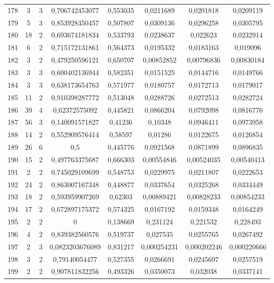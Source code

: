 \begin{longtable}{|c|c|c|c|c|c|c|c|}
178 & 3 & 3 & 0,706742453077 & 0,553035 & 0,0211689 & 0,0201818 & 0,0209119  \\
179 & 5 & 3 & 0,853928350457 & 0,507807 & 0,0309136 & 0,0296258 & 0,0305795  \\
180 & 18 & 2 & 0,693674181834 & 0,533793 & 0,0238637 & 0,022623 & 0,0232914  \\
181 & 6 & 2 & 0,715172131861 & 0,564373 & 0,0195332 & 0,0183163 & 0,019096  \\
182 & 3 & 2 & 0,479250596121 & 0,650707 & 0,00852852 & 0,00796836 & 0,00830184  \\
183 & 3 & 3 & 0,600402136944 & 0,582351 & 0,0151525 & 0,0144716 & 0,0149766  \\
184 & 3 & 3 & 0,638173654763 & 0,571977 & 0,0180757 & 0,0172713 & 0,0179017  \\
185 & 11 & 2 & 0,910398287772 & 0,513048 & 0,0288726 & 0,0272513 & 0,0282724  \\
186 & 39 & 4 & 0,62372575092 & 0,445821 & 0,0866204 & 0,0792098 & 0,0816776  \\
187 & 56 & 3 & 0,140091571827 & 0,41236 & 0,10348 & 0,0946411 & 0,0973958  \\
188 & 14 & 2 & 0,552909576414 & 0,58597 & 0,01286 & 0,0122675 & 0,0126854  \\
189 & 26 & 6 & 0,5 & 0,445776 & 0,0921568 & 0,0871899 & 0,0896835  \\
190 & 15 & 2 & 0,497763375687 & 0,666303 & 0,00554846 & 0,00524035 & 0,00540413  \\
191 & 2 & 2 & 0,745029109699 & 0,548753 & 0,0229975 & 0,0211807 & 0,0222653  \\
192 & 24 & 2 & 0,863007167348 & 0,448877 & 0,0337654 & 0,0325268 & 0,0334449  \\
193 & 18 & 2 & 0,593959907269 & 0,62303 & 0,00889421 & 0,00828233 & 0,00854233  \\
194 & 17 & 2 & 0,672897175372 & 0,574325 & 0,0167192 & 0,0159348 & 0,0164249  \\
195 & 2 & 2 & 0 & 0,138669 & 0,231124 & 0,221532 & 0,228493  \\
196 & 4 & 2 & 0,839382560576 & 0,519737 & 0,027535 & 0,0255765 & 0,0267492  \\
197 & 2 & 3 & 0,0823203676089 & 0,831217 & 0,000254231 & 0,000202246 & 0,000220666  \\
198 & 3 & 2 & 0,79140054477 & 0,527355 & 0,0266691 & 0,0245697 & 0,0257519  \\
199 & 2 & 2 & 0,907811832256 & 0,493326 & 0,0350073 & 0,032038 & 0,0337141  \\

\end{longtable}
